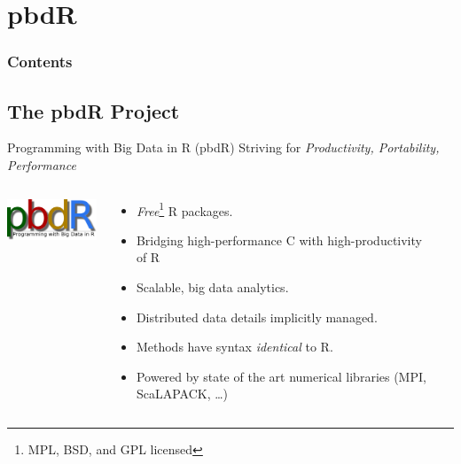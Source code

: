 \section{pbdR}

\hidenum
\begin{frame}[noframenumbering]
\frametitle{Contents}
 \tableofcontents[currentsection,hideothersubsections,sectionstyle=show/hide]
\end{frame}
\shownum


\subsection{The pbdR Project}


\begin{frame}
  \begin{block}{Programming with Big Data in R (pbdR)}
       \centering Striving for \emph{Productivity, Portability, Performance}\\[.4cm]\pause
  \begin{columns}[onlytextwidth]
    \begin{column}{0.30\textwidth}
      \centering
       \includegraphics[width=3.4cm]{../common/pics/simple}\\[.2cm]
    \end{column}
    \begin{column}{0.65\textwidth}
  \begin{itemize}[<+-|alert@+>]
    \item \emph{Free}\footnote{MPL, BSD, and GPL licensed} R packages.
    \item Bridging high-performance C with high-productivity of R
    \item Scalable, big data analytics.
    \item Distributed data details implicitly managed.
    \item Methods have syntax \emph{identical} to R.
    \item Powered by state of the art numerical libraries (MPI, ScaLAPACK, \dots)
  \end{itemize}
    \end{column}
​  \end{columns}
\end{block}
\end{frame}




